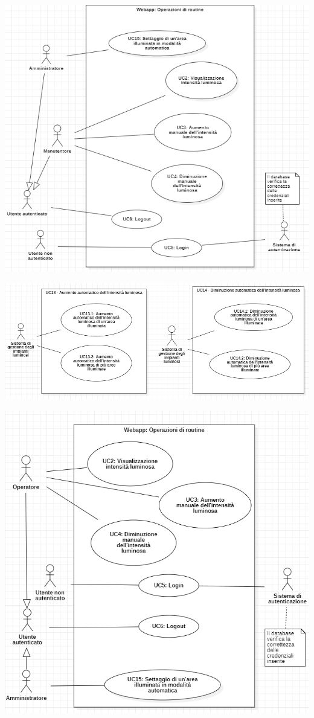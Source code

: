 \documentclass[a4paper, 12pt]{article}
\begin{document}
\includegraphics[scale=0.8]{diagramma_use_case_2.png}

\includegraphics[scale=0.65]{diagramma_use_case_3e4.png}

\includegraphics[scale=0.7]{diagramma_use_case_5.png}
\end{document}
